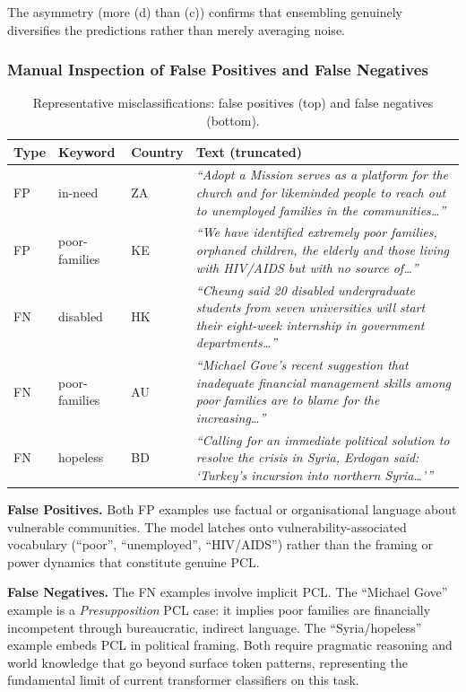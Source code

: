 \documentclass[11pt]{article}
\begin{document}
The asymmetry (more (d) than (c)) confirms that ensembling genuinely diversifies the predictions rather than merely averaging noise.

\subsubsection*{Manual Inspection of False Positives and False Negatives}

\begin{table}[H]
\centering
\small
\begin{tabular}{p{0.8cm}p{1.5cm}p{1.2cm}p{6.8cm}}
\toprule
Type & Keyword & Country & Text (truncated) \\
\midrule
FP & in-need & ZA & \textit{``Adopt a Mission serves as a platform for the church and for likeminded people to reach out to unemployed families in the communities\ldots''} \\[4pt]
FP & poor-families & KE & \textit{``We have identified extremely poor families, orphaned children, the elderly and those living with HIV/AIDS but with no source of\ldots''} \\
\midrule
FN & disabled & HK & \textit{``Cheung said 20 disabled undergraduate students from seven universities will start their eight-week internship in government departments\ldots''} \\[4pt]
FN & poor-families & AU & \textit{``Michael Gove's recent suggestion that inadequate financial management skills among poor families are to blame for the increasing\ldots''} \\[4pt]
FN & hopeless & BD & \textit{``Calling for an immediate political solution to resolve the crisis in Syria, Erdogan said: `Turkey's incursion into northern Syria\ldots'\thinspace''} \\
\bottomrule
\end{tabular}
\caption{Representative misclassifications: false positives (top) and false negatives (bottom).}
\label{tab:errors}
\end{table}

\textbf{False Positives.} Both FP examples use factual or organisational language about vulnerable communities. The model latches onto vulnerability-associated vocabulary (``poor'', ``unemployed'', ``HIV/AIDS'') rather than the framing or power dynamics that constitute genuine PCL.

\textbf{False Negatives.} The FN examples involve implicit PCL. The ``Michael Gove'' example is a \emph{Presupposition} PCL case: it implies poor families are financially incompetent through bureaucratic, indirect language. The ``Syria/hopeless'' example embeds PCL in political framing. Both require pragmatic reasoning and world knowledge that go beyond surface token patterns, representing the fundamental limit of current transformer classifiers on this task.
\end{document}

